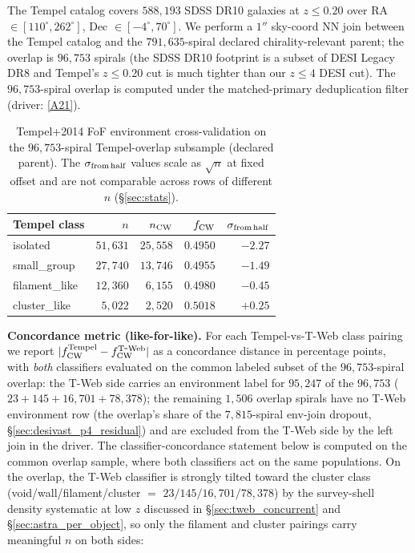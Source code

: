 \documentclass[aps,prd,twocolumn,superscriptaddress,showpacs,preprintnumbers,nofootinbib,longbibliography,floatfix]{revtex4-2}
\newcommand{\repoBase}{https://github.com/Hubify-Projects/bigbounce/blob/main}
\begin{document}
The Tempel catalog covers $588{,}193$ SDSS DR10 galaxies at
$z \le 0.20$ over RA $\in [110^\circ, 262^\circ]$, Dec $\in [-4^\circ,
70^\circ]$. We perform a $1''$ sky-coord NN join between the Tempel
catalog and the $791{,}635$-spiral declared chirality-relevant parent;
the overlap is $96{,}753$ spirals (the SDSS DR10 footprint is a
subset of DESI Legacy DR8 and Tempel's $z \le 0.20$ cut is much tighter
than our $z \le 4$ DESI cut). The $96{,}753$-spiral overlap is computed
under the matched-primary deduplication filter
(driver:
\href{\repoBase/pipelines/p5\_desi\_chirality/env\_finder/03\_tempel\_cross\_validation.py}{[A21]}).

\begin{table}[t]
\caption{Tempel+2014 FoF environment cross-validation on the
$96{,}753$-spiral Tempel-overlap subsample (declared parent). The
$\sigma_{\rm from\,half}$ values scale as $\sqrt{n}$ at fixed offset
and are not comparable across rows of different $n$ (\S\ref{sec:stats}).}
\label{tab:tempel}
\begin{ruledtabular}
\begin{tabular}{lrrrr}
Tempel class & $n$ & $n_{\rm CW}$ & $f_{\rm CW}$ & $\sigma_{\rm from\,half}$ \\
\hline
isolated      & $51{,}631$ & $25{,}558$ & $0.4950$ & $-2.27$ \\
small\_group  & $27{,}740$ & $13{,}746$ & $0.4955$ & $-1.49$ \\
filament\_like & $12{,}360$ & $6{,}155$ & $0.4980$ & $-0.45$ \\
cluster\_like  & $5{,}022$  & $2{,}520$ & $0.5018$ & $+0.25$ \\
\end{tabular}
\end{ruledtabular}
\end{table}

\textbf{Concordance metric (like-for-like).} For each Tempel-vs-T-Web
class pairing we
report $|f_{\rm CW}^{\rm Tempel} - f_{\rm CW}^{\rm T\mbox{-}Web}|$ as a
concordance distance in percentage points, with \emph{both} classifiers
evaluated on the common labeled subset of the $96{,}753$-spiral
overlap: the T-Web side carries an environment label for $95{,}247$
of the $96{,}753$ ($23 + 145 + 16{,}701 + 78{,}378$); the remaining
$1{,}506$ overlap spirals have no T-Web environment row (the
overlap's share of the $7{,}815$-spiral env-join dropout,
\S\ref{sec:desivast_p4_residual}) and are excluded from the T-Web
side by the left join in the driver. The classifier-concordance
statement below is computed on the common overlap sample, where both
classifiers act on the same populations.
On the overlap, the T-Web classifier is strongly tilted toward the
cluster class (void/wall/filament/cluster $=$
$23/145/16{,}701/78{,}378$) by the survey-shell density systematic at
low $z$ discussed in \S\ref{sec:tweb_concurrent} and
\S\ref{sec:astra_per_object}, so only the filament and cluster
pairings carry meaningful $n$ on both sides:
\end{document}
